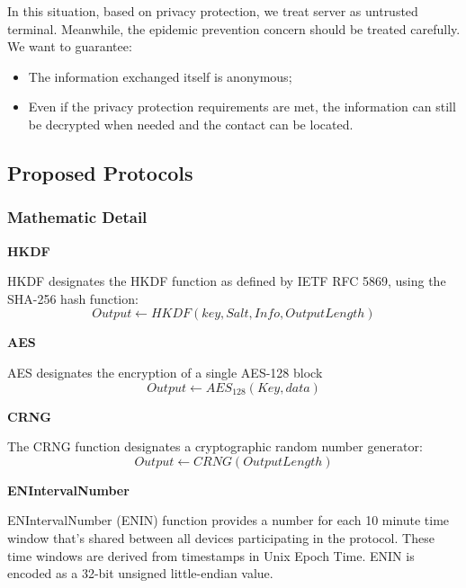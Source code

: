 \documentclass[11pt,en]{elegantpaper}
\begin{document}
In this situation, based on privacy protection, we treat server as untrusted terminal.\cite{berke2020assessing} Meanwhile, the epidemic prevention concern should be treated carefully. We want to guarantee:
\begin{itemize}
	\item The information exchanged itself is anonymous;
	\item Even if the privacy protection requirements are met, the information can still be decrypted when needed and the contact can be located.
	
\end{itemize}

\subsection{Proposed Protocols}

\subsubsection{Mathematic Detail}




\textbf{HKDF}

HKDF \cite{briefxip3322b}designates the HKDF function as defined by IETF RFC 5869, using the SHA-256 hash function: 
$$Output\leftarrow HKDF(key,Salt, Info, OutputLength)$$

\textbf{AES}

AES \cite{gueron2020flexible}designates the encryption of a single AES-128 block
$$Output\leftarrow AES_{128}(Key,data)$$

\textbf{CRNG}

The CRNG \cite{datcu2020chaos}function designates a cryptographic random number generator: 
$$Output\leftarrow CRNG(OutputLength)$$

\textbf{ENIntervalNumber}

ENIntervalNumber (ENIN) function provides a number for each 10 minute time window that’s shared between all devices participating in the protocol. These time windows are derived from timestamps in Unix Epoch Time. ENIN is encoded as a 32-bit unsigned little-endian value.
\end{document}
